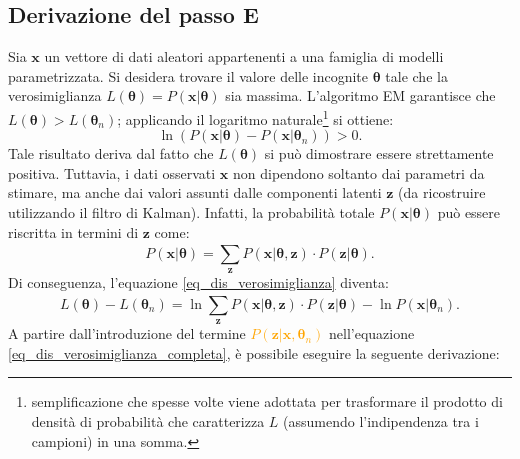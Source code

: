\subsection{Derivazione del passo E}
Sia $\mathbf{x}$ un vettore di dati aleatori appartenenti a una famiglia di modelli parametrizzata. Si desidera trovare il valore delle incognite $\boldsymbol{\theta}$ tale che la verosimiglianza $L(\boldsymbol{\theta})=P(\mathbf{x} | \boldsymbol{\theta})$ sia massima. L'algoritmo EM garantisce che $L(\boldsymbol{\theta}) > L(\boldsymbol{\theta}_n)$; applicando il logaritmo naturale\footnote{semplificazione che spesse volte viene adottata per trasformare il prodotto di densità di probabilità che caratterizza $L$ (assumendo l'indipendenza tra i campioni) in una somma.} si ottiene:
\begin{equation}
	\ln(P(\mathbf{x}|\boldsymbol{\theta}) - P(\mathbf{x}|\boldsymbol{\theta}_n)) > 0.
	\label{eq_dis_verosimiglianza}
\end{equation}
Tale risultato deriva dal fatto che $L(\boldsymbol{\theta})$ si può dimostrare essere strettamente positiva. Tuttavia, i dati osservati $\mathbf{x}$ non dipendono soltanto dai parametri da stimare, ma anche dai valori assunti dalle componenti latenti $\mathbf{z}$ (da ricostruire utilizzando il filtro di Kalman). Infatti, la probabilità totale $P(\mathbf{x}|\boldsymbol{\theta})$ può essere riscritta in termini di $\mathbf{z}$ come:
\[
	P(\mathbf{x}|\boldsymbol{\theta}) = \sum_{\mathbf{z}}^{}P(\mathbf{x}|\boldsymbol{\theta}, \mathbf{z})\cdot P(\mathbf{z}|\boldsymbol{\theta}).
\]
Di conseguenza, l'equazione \ref{eq_dis_verosimiglianza} diventa:
\begin{equation}
	L(\boldsymbol{\theta}) - L(\boldsymbol{\theta}_n) = \ln\sum_{\mathbf{z}}^{} P(\mathbf{x}|\boldsymbol{\theta}, \mathbf{z})\cdot P(\mathbf{z}|\boldsymbol{\theta}) - \ln P(\mathbf{x}|\boldsymbol{\theta}_n).
	\label{eq_dis_verosimiglianza_completa}
\end{equation}
A partire dall'introduzione del termine \textcolor{orange}{$P(\mathbf{z}|\mathbf{x},\boldsymbol{\theta}_n)$} nell'equazione \ref{eq_dis_verosimiglianza_completa}, è possibile eseguire la seguente derivazione:
